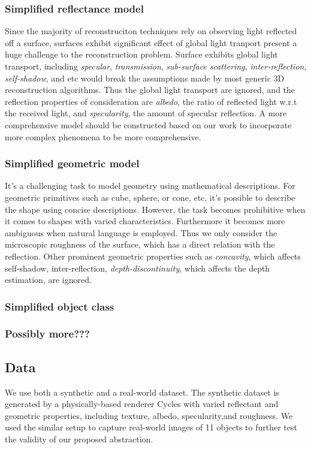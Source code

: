 \subsubsection{Simplified reflectance model}
Since the majority of reconstruciton techniques rely on observing light reflected off a surface, surfaces exhibit significant effect of global light tranport present a huge challenge to the reconstruction problem. Surface exhibits global light transport, including \textit{specular}, \textit{transmission}, \textit{sub-surface scattering}, \textit{inter-reflection}, \textit{self-shadow}, and etc would break the assumptions made by most generic 3D reconstruction algorithms. Thus the global light transport are ignored, and the reflection properties of consideration are \textit{albedo}, \ie the ratio of reflected light w.r.t the received light, and \textit{specularity}, \ie the amount of specular reflection. A more comprehensive model should be constructed based on our work to incorporate more complex phenomena to be more comprehensive.

\subsubsection{Simplified geometric model}
It's a challenging task to model geometry using mathematical descriptions. For geometric primitives such as cube, sphere, or cone, etc, it's possible to describe the shape using concise descriptions. However, the task becomes prohibitive when it comes to shapes with varied characteristics. Furthermore it becomes more ambiguous when natural language is employed. Thus we only consider the microscopic roughness of the surface, which has a direct relation with the reflection. Other prominent geometric properties such as \textit{concavity}, which affects self-shadow, inter-reflection, \textit{depth-discontinuity}, which affects the depth estimation, are ignored.

\subsubsection{Simplified object class}

\subsubsection{Possibly more???}

\subsection{Data}
We use both a synthetic and a real-world dataset. The synthetic dataset is generated by a physically-based renderer Cycles with varied reflectant and geometric properties, including texture, albedo, specularity,and roughness. We used the similar setup to capture real-world images of 11 objects to further test the validity of our proposed abstraction.

